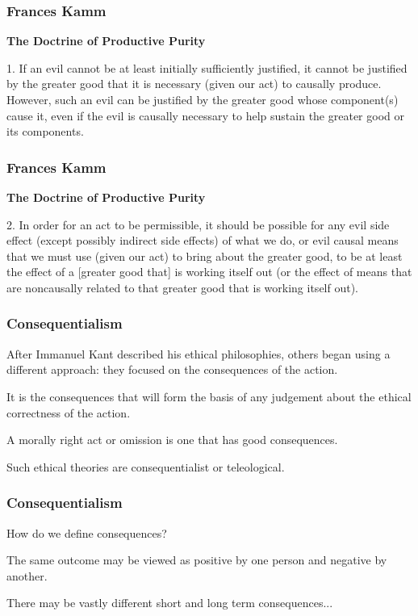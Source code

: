 \begin{frame}
\frametitle{Frances Kamm}

\textbf{The Doctrine of Productive Purity}

1. If an evil cannot be at least initially sufficiently justified, it cannot be justified by the greater good that it is necessary (given our act) to causally produce. However, such an evil can be justified by the greater good whose component(s) cause it, even if the evil is causally necessary to help sustain the greater good or its components.


\end{frame}

\begin{frame}
\frametitle{Frances Kamm}

\textbf{The Doctrine of Productive Purity}

2. In order for an act to be permissible, it should be possible for any evil side effect (except possibly indirect side effects) of what we do, or evil causal means that we must use (given our act) to bring about the greater good, to be at least the effect of a [greater good that] is working itself out (or the effect of means that are noncausally related to that greater good that is working itself out).

\end{frame}



\begin{frame}
\frametitle{Consequentialism}


After Immanuel Kant described his ethical philosophies, others began using a different approach: they focused on the consequences of the action.

It is the consequences that will form the basis of any judgement about the ethical correctness of the action.

A morally right act or omission is one that has good consequences.

Such ethical theories are \alert{consequentialist} or \alert{teleological}.

\end{frame}



\begin{frame}
\frametitle{Consequentialism}

How do we define consequences?

The same outcome may be viewed as positive by one person and negative by another.

There may be vastly different short and long term consequences...

\end{frame}



